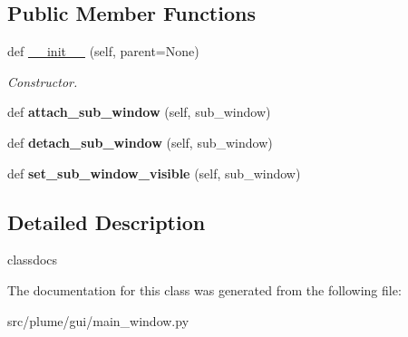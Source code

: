 \subsection*{Public Member Functions}
\begin{DoxyCompactItemize}
\item 
def \hyperlink{classplume-creator_1_1src_1_1plume_1_1gui_1_1main__window_1_1_sub_window_stack_af38866629baea6b5930fbd3708777f98}{\+\_\+\+\_\+init\+\_\+\+\_\+} (self, parent=None)\hypertarget{classplume-creator_1_1src_1_1plume_1_1gui_1_1main__window_1_1_sub_window_stack_af38866629baea6b5930fbd3708777f98}{}\label{classplume-creator_1_1src_1_1plume_1_1gui_1_1main__window_1_1_sub_window_stack_af38866629baea6b5930fbd3708777f98}

\begin{DoxyCompactList}\small\item\em Constructor. \end{DoxyCompactList}\item 
def {\bfseries attach\+\_\+sub\+\_\+window} (self, sub\+\_\+window)\hypertarget{classplume-creator_1_1src_1_1plume_1_1gui_1_1main__window_1_1_sub_window_stack_a3f4e45164179d15c63ee78aa0dffd9a5}{}\label{classplume-creator_1_1src_1_1plume_1_1gui_1_1main__window_1_1_sub_window_stack_a3f4e45164179d15c63ee78aa0dffd9a5}

\item 
def {\bfseries detach\+\_\+sub\+\_\+window} (self, sub\+\_\+window)\hypertarget{classplume-creator_1_1src_1_1plume_1_1gui_1_1main__window_1_1_sub_window_stack_acc70c774456b5660f46efc5f2586a450}{}\label{classplume-creator_1_1src_1_1plume_1_1gui_1_1main__window_1_1_sub_window_stack_acc70c774456b5660f46efc5f2586a450}

\item 
def {\bfseries set\+\_\+sub\+\_\+window\+\_\+visible} (self, sub\+\_\+window)\hypertarget{classplume-creator_1_1src_1_1plume_1_1gui_1_1main__window_1_1_sub_window_stack_aadc1b307e105506a04f83195efffd31b}{}\label{classplume-creator_1_1src_1_1plume_1_1gui_1_1main__window_1_1_sub_window_stack_aadc1b307e105506a04f83195efffd31b}

\end{DoxyCompactItemize}


\subsection{Detailed Description}
classdocs 

The documentation for this class was generated from the following file\+:\begin{DoxyCompactItemize}
\item 
src/plume/gui/main\+\_\+window.\+py\end{DoxyCompactItemize}
